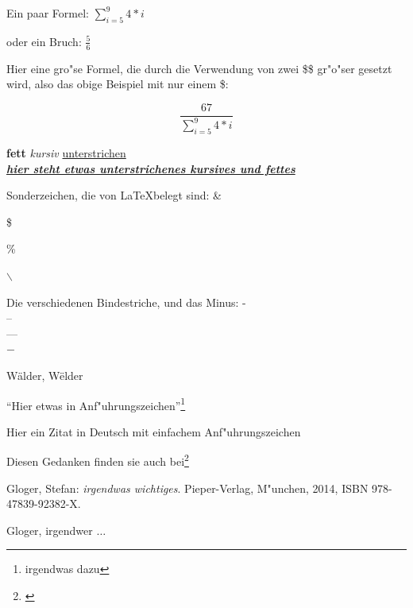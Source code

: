 \documentclass{article}
\begin{document}
\newpage

	Ein paar Formel: 
	$\sum^{9}_{i=5}{4*i}$
	
	oder ein Bruch: $\frac{5}{6}$

	
   \vspace*{2cm}

  	Hier eine gro"se Formel, die durch die Verwendung von zwei \${}\${} gr"o"ser gesetzt wird,
	also das obige Beispiel mit nur einem \${}:

   	$$ \frac{67}{\sum^{9}_{i=5}{4*i}} $$





\newpage

	\textbf{fett} \textit{kursiv} \underline{unterstrichen} \\

	\textbf{ \textit{ \underline {hier steht etwas unterstrichenes kursives und fettes } }  }


	Sonderzeichen, die von \LaTeX belegt sind:
	\&
	
	\$
	
	\%
	
	$\backslash $

	Die verschiedenen Bindestriche, und das Minus:
	- \\
	-- \\
	--- \\
	$-$

	
	
	W\"alder, W\"elder

	``Hier etwas in Anf"uhrungszeichen''\footnote{irgendwas dazu}

	\glqq Hier ein Zitat in Deutsch \glq{}mit einfachem Anf"uhrungszeichen\grq{} \grqq

	Diesen Gedanken finden sie auch bei\footnote{ \cite[S. 13]{AG14-2014} }

\newpage


\begin{thebibliography}{Gloger-hihihi2013}

		Gloger, Stefan: \textit{irgendwas wichtiges}.
		Pieper-Verlag, M"unchen, 2014, ISBN 978-47839-92382-X.
	
		Gloger, irgendwer $\ldots$

\end{thebibliography}
\end{document}
